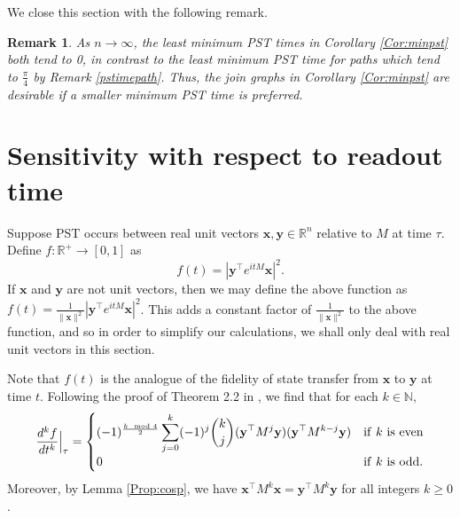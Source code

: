 \documentclass[11pt]{article}
\newtheorem{remark}[theorem]{Remark}
\newcommand{\bx}{\mathbf x}
\newcommand{\by}{\mathbf y}
\def\R{\mathbb{R}}
\begin{document}
We close this section with the following remark.

\begin{remark}
As $n\rightarrow\infty$, the least minimum PST times in Corollary \ref{Cor:minpst} both tend to 0, in contrast to the least minimum PST time for paths which tend to $\frac{\pi}{4}$ by Remark \ref{pstimepath}. Thus, the join graphs in Corollary \ref{Cor:minpst} are desirable if a smaller minimum PST time is preferred.
\end{remark}

\section{Sensitivity with respect to  readout time}\label{Sec:sens}
 
Suppose PST occurs between real unit vectors $\bx, \by \in \R^n$ relative to $M$ at time $\tau$. Define $f:\R^+\rightarrow [0,1]$ as $$f(t) = |\by^\top e^{itM}\bx|^2.$$
If $\bx$ and $\by$ are not unit vectors, then we may define the above function as $f(t) =\frac{1}{\|\bx\|^2} |\by^\top e^{itM}\bx|^2$. This adds a constant factor of $\frac{1}{\|\bx\|^2}$ to the above function, and so in order to simplify our calculations, we shall only deal with real unit vectors in this section.

Note that $f(t)$ is the analogue of the fidelity of state transfer from $\bx$ to $\by$ at time $t$. Following the proof of Theorem 2.2 in \cite{Ksens}, we find that for each $k \in \mathbb{N},$ 
\begin{equation}
\label{Eq:f2}
\frac{d^kf}{dt^k}\Big|_{\tau} = \begin{cases} (-1)^{\frac{k \mod 4}{2}} \displaystyle\sum_{j=0}^k(-1)^j {{k}\choose{j}} (\by^\top M^j \by)( \by^\top M^{k-j}\by) & {\rm{if}} \  k \ \rm{is \ even}\\
0 & {\rm{if}} \  k \ \rm{is \ odd}. \end{cases}  
\end{equation}
Moreover, by Lemma \ref{Prop:cosp}, we have $\bx^\top M^k \bx= \by^\top M^k \by$ for all integers $k\geq 0$.
\end{document}
